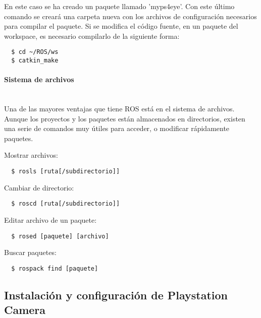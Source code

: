 En este caso se ha creado un paquete llamado 'myps4eye'. Con este último comando
se creará una carpeta nueva con los archivos de configuración necesarios para
compilar el paquete. Si se modifica el código fuente, en un paquete del
workspace, es necesario compilarlo de la siguiente forma:
\\
\begin{lstlisting}
  $ cd ~/ROS/ws
  $ catkin_make
\end{lstlisting}

\paragraph{Sistema de archivos} \hspace{0pt} \\
Una de las mayores ventajas que tiene ROS está en el sistema de archivos. Aunque
los proyectos y los paquetes están almacenados en directorios, existen una serie
de comandos muy útiles para acceder, o modificar rápidamente paquetes.

Mostrar archivos:
\\
\begin{lstlisting}
  $ rosls [ruta[/subdirectorio]]
\end{lstlisting}

Cambiar de directorio:
\\
\begin{lstlisting}
  $ roscd [ruta[/subdirectorio]]
\end{lstlisting}

Editar archivo de un paquete:
\\
\begin{lstlisting}
  $ rosed [paquete] [archivo]
\end{lstlisting}

Buscar paquetes:
\\
\begin{lstlisting}
  $ rospack find [paquete]
\end{lstlisting}


\subsection{Instalación y configuración de Playstation Camera}


